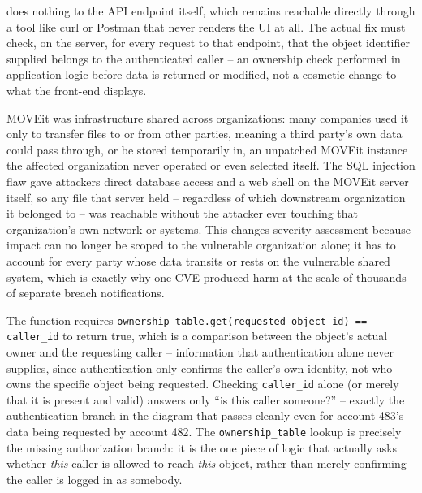 \begin{answerkey}
does nothing to the API endpoint itself, which remains reachable directly through a tool like curl
or Postman that never renders the UI at all. The actual fix must check, on the server, for every
request to that endpoint, that the object identifier supplied belongs to the authenticated caller
-- an ownership check performed in application logic before data is returned or modified, not a
cosmetic change to what the front-end displays.
\item MOVEit was infrastructure shared across organizations: many companies used it only to
transfer files to or from other parties, meaning a third party's own data could pass through, or
be stored temporarily in, an unpatched MOVEit instance the affected organization never operated or
even selected itself. The SQL injection flaw gave attackers direct database access and a web shell
on the MOVEit server itself, so any file that server held -- regardless of which downstream
organization it belonged to -- was reachable without the attacker ever touching that
organization's own network or systems. This changes severity assessment because impact can no
longer be scoped to the vulnerable organization alone; it has to account for every party whose
data transits or rests on the vulnerable shared system, which is exactly why one CVE produced
harm at the scale of thousands of separate breach notifications.
\item The function requires \texttt{ownership\_table.get(requested\_object\_id) == caller\_id} to
return true, which is a comparison between the object's actual owner and the requesting caller --
information that authentication alone never supplies, since authentication only confirms the
caller's own identity, not who owns the specific object being requested. Checking
\texttt{caller\_id} alone (or merely that it is present and valid) answers only ``is this caller
someone?'' -- exactly the authentication branch in the diagram that passes cleanly even for account
483's data being requested by account 482. The \texttt{ownership\_table} lookup is precisely the
missing authorization branch: it is the one piece of logic that actually asks whether \emph{this}
caller is allowed to reach \emph{this} object, rather than merely confirming the caller is logged
in as somebody.
\end{answerkey}

